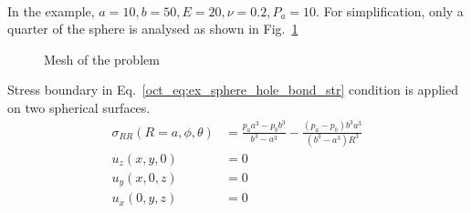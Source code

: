 \paragraph{}
In the example, $a = 10,b = 50, E=20,\nu = 0.2,P_a = 10$.
For simplification, only a quarter of the sphere is analysed as shown in Fig.~\ref{oct_fig:ex_hollow_sphere_meshP}

\begin{figure}[h!]
  \centering
  \caption{Mesh of the problem}
  \label{oct_fig:ex_hollow_sphere_meshP}
\end{figure}

Stress boundary in Eq.~\ref{oct_eq:ex_sphere_hole_bond_str} condition is applied on two spherical surfaces.
\begin{subequations}
    \begin{align}
    \sigma_{RR}(R=a,\phi,\theta) & = \frac{p_aa^3-p_bb^3}{b^3-a^3} - \frac{(p_a-p_b)b^3a^3}{(b^3-a^3)R^3}\\
    u_z(x,y,0) &= 0\\
    u_y(x,0,z) & = 0 \\
    u_x(0,y,z) & = 0
  \end{align}
\label{oct_eq:ex_sphere_hole_bond_str}
\end{subequations}

